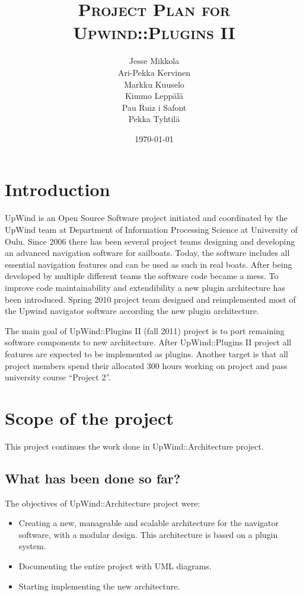\documentclass[12pt,titlepage]{article}
\date{\today}
\title{\textsc{Project Plan for Upwind::Plugins II}}
\author{Jesse Mikkola\\
		Ari-Pekka Kervinen\\
		Markku Kuuselo\\
		Kimmo Leppälä\\
		Pau Ruiz i Safont\\
		Pekka Tyhtilä}
\begin{document}
\maketitle
\tableofcontents
\newpage

\section{Introduction}

	UpWind is an Open Source Software project initiated and coordinated by the UpWind team at Department of Information Processing Science at University of Oulu.
	Since 2006 there has been several project teams designing and developing an advanced navigation software for sailboats.
	Today, the software includes all essential navigation features and can be used as such in real boats. 
	After being developed by multiple different teams the software code became a mess. To improve code maintainability and extendibility a new plugin architecture has been introduced.
	Spring 2010 project team designed and reimplemented most of the Upwind navigator software according the new plugin architecture.

	The main goal of UpWind::Plugins II (fall 2011) project is to port remaining software components to new architecture.
	After UpWind::Plugins II project all features are expected to be implemented as plugins. 
	Another target is that all project members spend their allocated 300 hours working on project and pass university course ``Project 2''.

\section{Scope of the project}
 
 	This project continues the work done in UpWind::Architecture project.
 	
	\subsection{What has been done so far?}
 
		The objectives of UpWind::Architecture project were:

		\begin{itemize}
			\item Creating a new, manageable and scalable architecture for the navigator software, with a modular design.
				This architecture is based on a plugin system.
			\item Documenting the entire project with UML diagrams.
			\item Starting implementing the new architecture.
		\end{itemize}
 
\end{document}
